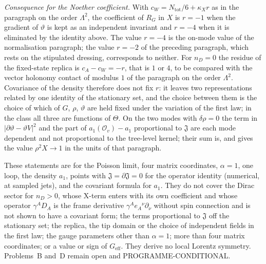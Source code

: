 \emph{Consequence for the Noether coefficient.} With \(c_W=N_{\mathrm{tot}}/6+\kappa_Xr\) as in the paragraph on the order \(\Lambda^2\), the coefficient of \(R_G\) in \(X\) is \(r=-1\) when the gradient of \(\vartheta\) is kept as an independent invariant and \(r=-4\) when it is eliminated by the identity above. The value \(r=-4\) is the on-mode value of the normalisation paragraph; the value \(r=-2\) of the preceding paragraph, which rests on the stipulated dressing, corresponds to neither. For \(n_D=0\) the residue of the fixed-state replica is \(c_A-c_W=-r\), that is \(1\) or \(4\), to be compared with the vector holonomy contact of modulus \(1\) of the paragraph on the order \(\Lambda^2\). Covariance of the density therefore does not fix \(r\): it leaves two representations related by one identity of the stationary set, and the choice between them is the choice of which of \(G\), \(\rho\), \(\vartheta\) are held fixed under the variation of the first law; in the class all three are functions of \(\Theta\). On the two modes with \(\delta\rho=0\) the term in \(\lvert\partial\vartheta-\vartheta V\rvert^2\) and the part of \(a_1(\mathcal O_v)-a_1\) proportional to \(\mathfrak J\) are each mode dependent and not proportional to the tree-level kernel; their sum is, and gives the value \(\rho^2X\to1\) in the units of that paragraph.

These statements are for the Poisson limit, four matrix coordinates, \(\alpha=1\), one loop, the density \(a_1\), points with \(\mathfrak J=\partial\mathfrak J=0\) for the operator identity (numerical, at sampled jets), and the covariant formula for \(a_1\). They do not cover the Dirac sector for \(n_D>0\), whose X-term enters with its own coefficient and whose operator \(\gamma^AD_A\) is the frame derivative \(\gamma^Ae_A{}^\nu\partial_\nu\) without spin connection and is not shown to have a covariant form; the terms proportional to \(\mathfrak J\) off the stationary set; the replica, the tip domain or the choice of independent fields in the first law; the gauge parameters other than \(\alpha=1\); more than four matrix coordinates; or a value or sign of \(G_{\mathrm{eff}}\). They derive no local Lorentz symmetry. Problems~B and~D remain open and PROGRAMME-CONDITIONAL.


